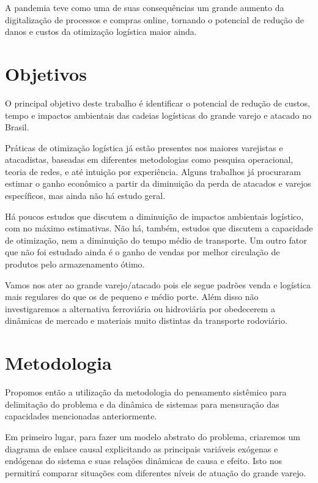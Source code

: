 \documentclass[]{article}
\begin{document}
	A pandemia teve como uma de suas consequências um grande aumento da digitalização de processos e compras online, tornando o potencial de redução de danos e custos da otimização logística maior ainda. 
	
	\section{Objetivos}
	
	O principal objetivo deste trabalho é identificar o potencial de redução de custos, tempo e impactos ambientais das cadeias logísticas do grande varejo e atacado no Brasil. 
	
	Práticas de otimização logística já estão presentes nos maiores varejistas e atacadistas, baseadas em diferentes metodologias como pesquisa operacional, teoria de redes, e até intuição por experiência. Alguns trabalhos já procuraram estimar o ganho econômico a partir da diminuição da perda de atacados e varejos específicos, mas ainda não há estudo geral. 
	
	Há poucos estudos que discutem a diminuição de impactos ambientais logístico, com no máximo estimativas. Não há, também, estudos que discutem a capacidade de otimização, nem a diminuição do tempo médio de transporte. Um outro fator que não foi estudado ainda é o ganho de vendas por melhor circulação de produtos pelo armazenamento ótimo. 
	
	Vamos nos ater ao grande varejo/atacado pois ele segue padrões venda e logística mais regulares do que os de pequeno e médio porte. Além disso não investigaremos a alternativa ferroviária ou hidroviária por obedecerem a dinâmicas de mercado e materiais muito distintas da transporte rodoviário.
	
	\section{Metodologia}
	
	Propomos então a utilização da metodologia do pensamento sistêmico para delimitação do problema e da dinâmica de sistemas para mensuração das capacidades mencionadas anteriormente.
	
	Em primeiro lugar, para fazer um modelo abstrato do problema, criaremos um diagrama de enlace causal explicitando as principais variáveis exógenas e endógenas do sistema e suas relações dinâmicas de causa e efeito. Isto nos permitirá comparar situações com diferentes níveis de atuação do grande varejo.
	
\end{document}
